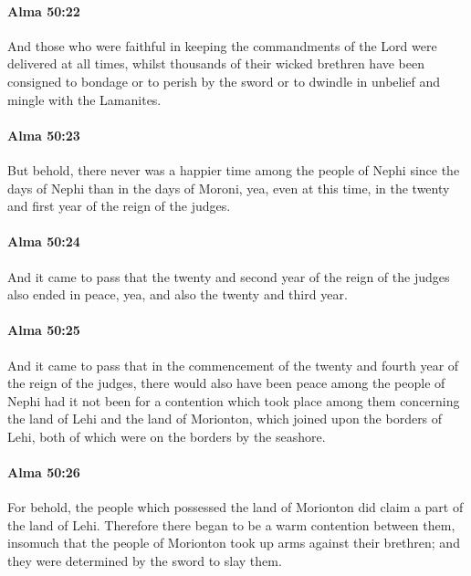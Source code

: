 		\paragraph{Alma 50:22} %
			\label{ALMA-50-22}

			And those who were faithful in keeping the commandments of the Lord
			were delivered at all times,
			whilst thousands of their wicked brethren have been consigned
			to bondage or to perish by the sword
			or to dwindle in unbelief and mingle with the Lamanites.

		\paragraph{Alma 50:23} %
			\label{ALMA-50-23}

			But behold, there never was a happier time among the people of Nephi
			since the days of Nephi than in the days of Moroni,
			yea, even at this time, in the twenty and first year of the reign of the judges.

		\paragraph{Alma 50:24} %
			\label{ALMA-50-24}

			And it came to pass that the twenty and second year
			of the reign of the judges also ended in peace,
			yea, and also the twenty and third year.

		\paragraph{Alma 50:25} %
			\label{ALMA-50-25}

			And it came to pass that in the commencement
			of the twenty and fourth year of the reign of the judges,
			there would also have been peace among the people of Nephi
			had it not been for a contention which took place among them
			concerning the land of Lehi and the land of Morionton,
			which joined upon the borders of Lehi,
			both of which were on the borders by the seashore.

		\paragraph{Alma 50:26} %
			\label{ALMA-50-26}

			For behold, the people which possessed the land of Morionton
			did claim a part of the land of Lehi.
			Therefore there began to be a warm contention between them,
			insomuch that the people of Morionton took up arms against their brethren;
			and they were determined by the sword to slay them.

